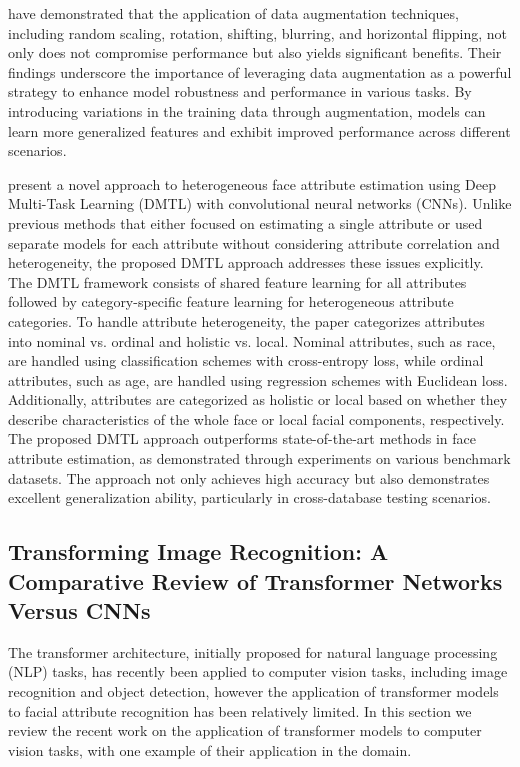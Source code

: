 \documentclass{article}
\begin{document}
\citet{DBLP:journals/corr/GuntherRB16} have demonstrated that the application of data augmentation techniques, including random scaling, rotation, shifting, blurring, and horizontal flipping, not only does not compromise performance but also yields significant benefits.
Their findings underscore the importance of leveraging data augmentation as a powerful strategy to enhance model robustness and performance in various tasks.
By introducing variations in the training data through augmentation, models can learn more generalized features and exhibit improved performance across different scenarios.

\citet{DBLP:journals/corr/HanJSC17} present a novel approach to heterogeneous face attribute estimation using Deep Multi-Task Learning (DMTL) with convolutional neural networks (CNNs).
Unlike previous methods that either focused on estimating a single attribute or used separate models for each attribute without considering attribute correlation and heterogeneity, the proposed DMTL approach addresses these issues explicitly.
The DMTL framework consists of shared feature learning for all attributes followed by category-specific feature learning for heterogeneous attribute categories.
To handle attribute heterogeneity, the paper categorizes attributes into nominal vs. ordinal and holistic vs. local.
Nominal attributes, such as race, are handled using classification schemes with cross-entropy loss, while ordinal attributes, such as age, are handled using regression schemes with Euclidean loss.
Additionally, attributes are categorized as holistic or local based on whether they describe characteristics of the whole face or local facial components, respectively.
The proposed DMTL approach outperforms state-of-the-art methods in face attribute estimation, as demonstrated through experiments on various benchmark datasets.
The approach not only achieves high accuracy but also demonstrates excellent generalization ability, particularly in cross-database testing scenarios.

\subsection{Transforming Image Recognition: A Comparative Review of Transformer Networks Versus CNNs}
The transformer architecture, initially proposed for natural language processing (NLP) tasks, has recently been applied to computer vision tasks, including image recognition and object detection,
however the application of transformer models to facial attribute recognition has been relatively limited.
In this section we review the recent work on the application of transformer models to computer vision tasks, with one example of their application in the domain.
\end{document}
